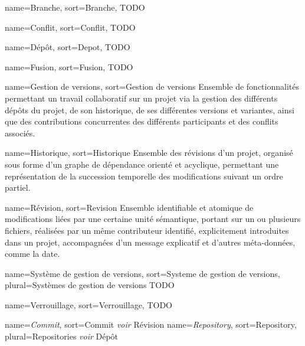 
{
name=Branche,
sort=Branche,
}
{TODO}

{
name=Conflit,
sort=Conflit,
}
{TODO}

{
name=Dépôt,
sort=Depot,
}
{TODO}

{
name=Fusion,
sort=Fusion,
}
{TODO}

{
name=Gestion de versions,
sort=Gestion de versions
}
{Ensemble de fonctionnalités permettant un travail collaboratif sur un projet via la gestion des différents dépôts du projet, de son historique, de ses différentes versions et variantes, ainsi que des contributions concurrentes des différents participants et des conflits associés.}

{
name=Historique,
sort=Historique
}
{Ensemble des révisions d'un projet, organisé sous forme d'un graphe de dépendance orienté et acyclique, permettant une représentation de la succession temporelle des modifications suivant un ordre partiel.}

{
name=Révision,
sort=Revision
}
{Ensemble identifiable et atomique de modifications liées par une certaine unité sémantique, portant sur un ou plusieurs fichiers, réalisées par un même contributeur identifié, explicitement introduites dans un projet, accompagnées d'un message explicatif et d'autres méta-données, comme la date.}

{
  name=Système de gestion de versions,
  sort=Systeme de gestion de versions,
  plural=Systèmes de gestion de versions
}
{TODO}

{
  name=Verrouillage,
  sort=Verrouillage,
}
{TODO}

{
name={\it Commit\/},
sort=Commit
}
{{\it voir\/} Révision}
{
  name={\it Repository\/},
  sort=Repository,
  plural=Repositories
}
{{\it voir\/} Dépôt}
